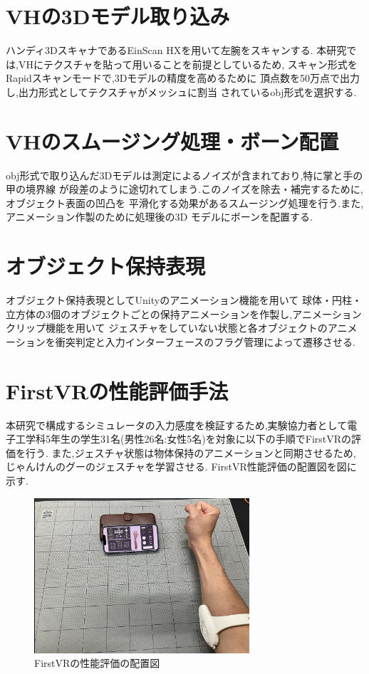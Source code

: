 \documentclass{ltjsreport}
\begin{document}
	\section{VHの3Dモデル取り込み}
		ハンディ3DスキャナであるEinScan HXを用いて左腕をスキャンする.
		本研究では,VHにテクスチャを貼って用いることを前提としているため,
		スキャン形式をRapidスキャンモードで,3Dモデルの精度を高めるために
		頂点数を50万点で出力し,出力形式としてテクスチャがメッシュに割当
		されているobj形式を選択する.

	\section{VHのスムージング処理・ボーン配置}
		obj形式で取り込んだ3Dモデルは測定によるノイズが含まれており,特に掌と手の甲の境界線
		が段差のように途切れてしまう.このノイズを除去・補完するために,オブジェクト表面の凹凸を
		平滑化する効果があるスムージング処理を行う.また,アニメーション作製のために処理後の3D
		モデルにボーンを配置する.

	\section{オブジェクト保持表現}
		オブジェクト保持表現としてUnityのアニメーション機能を用いて
		球体・円柱・立方体の3個のオブジェクトごとの保持アニメーションを作製し,アニメーションクリップ機能を用いて
		ジェスチャをしていない状態と各オブジェクトのアニメーションを衝突判定と入力インターフェースのフラグ管理によって遷移させる.

	\section{FirstVRの性能評価手法}
		本研究で構成するシミュレータの入力感度を検証するため,実験協力者として電子工学科5年生の学生31名(男性26名:女性5名)を対象に以下の手順でFirstVRの評価を行う.
		また,ジェスチャ状態は物体保持のアニメーションと同期させるため,じゃんけんのグーのジェスチャを学習させる.
		FirstVR性能評価の配置図を図に示す.
		\begin{figure}[H]
			\centering
			\includegraphics[width = 8cm]{../figs/IMG_5202.PNG}
			\caption{FirstVRの性能評価の配置図}
			\label{fig:firstVRtest}
		\end{figure}
		\vspace{-15pt}
\end{document}
